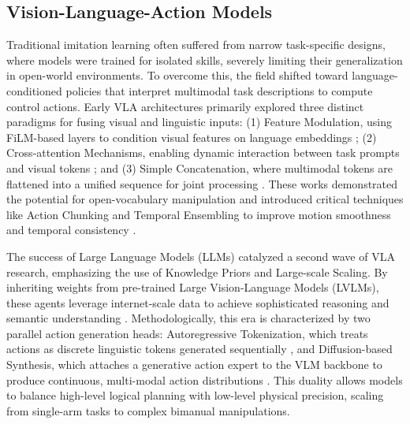 \label{sec:background}


\subsection{Vision-Language-Action Models}

Traditional imitation learning often suffered from narrow task-specific designs, where models were trained for isolated skills, severely limiting their generalization in open-world environments. To overcome this, the field shifted toward language-conditioned policies that interpret multimodal task descriptions to compute control actions. Early VLA architectures primarily explored three distinct paradigms for fusing visual and linguistic inputs: (1) Feature Modulation, using FiLM-based layers to condition visual features on language embeddings \cite{BC-Z, RT-1}; (2) Cross-attention Mechanisms, enabling dynamic interaction between task prompts and visual tokens \cite{ VIMA-Bench, RT-2}; and (3) Simple Concatenation, where multimodal tokens are flattened into a unified sequence for joint processing \cite{Gato,  VIMA-Bench}. These works demonstrated the potential for open-vocabulary manipulation \cite{CLIPort} and introduced critical techniques like Action Chunking and Temporal Ensembling to improve motion smoothness and temporal consistency \cite{ACT, RoboSet}.

The success of Large Language Models (LLMs) catalyzed a second wave of VLA research, emphasizing the use of Knowledge Priors and Large-scale Scaling. By inheriting weights from pre-trained Large Vision-Language Models (LVLMs), these agents leverage internet-scale data to achieve sophisticated reasoning and semantic understanding \cite{RT-2, OpenVLA}. Methodologically, this era is characterized by two parallel action generation heads: Autoregressive Tokenization, which treats actions as discrete linguistic tokens generated sequentially \cite{RT-2, OpenVLA, FAST, RoboFlamingo}, and Diffusion-based Synthesis, which attaches a generative action expert to the VLM backbone to produce continuous, multi-modal action distributions \cite{pi0, RDT-1B, pi05, DiffusionVLA}. This duality allows models to balance high-level logical planning with low-level physical precision, scaling from single-arm tasks to complex bimanual manipulations.

